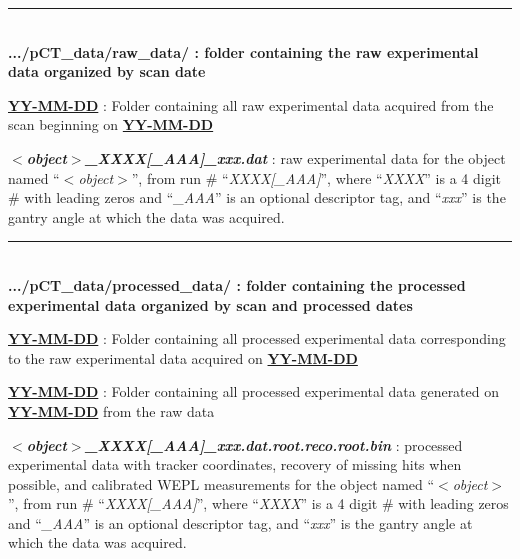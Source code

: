 \documentclass[landscape]{article}
\begin{document}
\newpage
\rule{\textwidth}{1pt}
{\\\vspace{0.5cm}\textbf{{.../pCT\_data/raw\_data/ :} folder containing the raw experimental data organized by scan date}}
\begin{myEnumerate}[labelindent=1pt, leftmargin=*]
    \item \ul{\textbf{YY-MM-DD}} : Folder containing all raw experimental data acquired from the scan beginning on \ul{\textbf{YY-MM-DD}}
    \begin{myEnumerate}[labelindent=1pt, leftmargin=*]
        \item \textbf{\textit{$<$object$>$\_XXXX[\_AAA]\_xxx.dat}} : raw experimental data for the object named ``\textit{$<$object$>$}'', from run \# ``\textit{XXXX[\_AAA]}'', where ``\textit{XXXX}'' is a 4 digit \# with leading zeros and ``\textit{\_AAA}'' is an optional descriptor tag, and ``\textit{xxx}'' is the gantry angle at which the data was acquired.
    \end{myEnumerate}
\end{myEnumerate}
\rule{\textwidth}{1pt}
{\\\vspace{0.5cm}\textbf{{.../pCT\_data/processed\_data/ :} folder containing the processed experimental data organized by scan and processed dates}}
\begin{myEnumerate}[labelindent=1pt, leftmargin=*]
    \item \ul{\textbf{YY-MM-DD}} : Folder containing all processed experimental data corresponding to the raw experimental data acquired on \ul{\textbf{YY-MM-DD}}
    \begin{myEnumerate}[labelindent=1pt, leftmargin=*]
        \item \ul{\textbf{YY-MM-DD}} : Folder containing all processed experimental data generated on \ul{\textbf{YY-MM-DD}} from the raw data
        \begin{myEnumerate}[labelindent=1pt, leftmargin=*]
            \item \textbf{\textit{$<$object$>$\_XXXX[\_AAA]\_xxx.dat.root.reco.root.bin}} : processed experimental data with tracker coordinates, recovery of missing hits when possible, and calibrated WEPL measurements for the object named ``\textit{$<$object$>$}'', from run \# ``\textit{XXXX[\_AAA]}'', where ``\textit{XXXX}'' is a 4 digit \# with leading zeros and ``\textit{\_AAA}'' is an optional descriptor tag, and ``\textit{xxx}'' is the gantry angle at which the data was acquired.
        \end{myEnumerate}
    \end{myEnumerate}
\end{myEnumerate}
\end{document}
